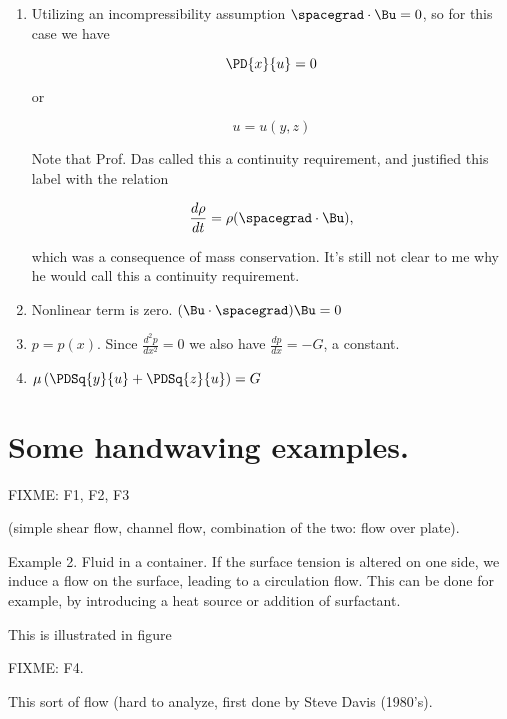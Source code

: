 \begin{enumerate}
\item 
Utilizing an incompressibility assumption $\spacegrad \cdot \Bu = 0$, so for this case we have

\begin{equation*}
\PD{x}{u} = 0
\end{equation*}

or 

\begin{equation*}
u = u(y, z)
\end{equation*}

Note that Prof. Das called this a continuity requirement, and justified this label with the relation

\begin{equation}\label{eqn:classicalMechanicsPs2:550}
\frac{d\rho}{dt} = \rho (\spacegrad \cdot \Bu),
\end{equation}

which was a consequence of mass conservation.  It's still not clear to me why he would call this a continuity requirement.

\item Nonlinear term is zero.  $(\Bu \cdot \spacegrad) \Bu = 0$
\item $p = p(x)$.  Since $\frac{d^2 p}{dx^2} = 0$ we also have $\frac{dp}{dx} = -G$, a constant.

\item $\mu \left( \PDSq{y}{u} + \PDSq{z}{u} \right) = G$

\end{enumerate}

\section{Some handwaving examples.}

FIXME: F1, F2, F3

(simple shear flow, channel flow, combination of the two: flow over plate).

Example 2.  Fluid in a container.  If the surface tension is altered on one side, we induce a flow on the surface, leading to a circulation flow.  This can be done for example, by introducing a heat source or addition of surfactant.

This is illustrated in figure

FIXME: F4.

This sort of flow (hard to analyze, first done by Steve Davis (1980's).

